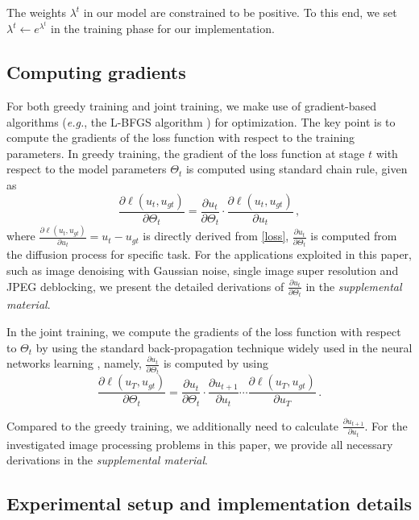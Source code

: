 \documentclass[10pt,journal,compsoc]{IEEEtran}
\newcommand{\eg}{\emph{e.g.}}
\begin{document}
{The weights $\lambda^t$ in our model are constrained to be positive. 
To this end, we set $\lambda^t \leftarrow e^{\lambda^t}$ in the training phase 
for our implementation.} 
\subsection{Computing gradients}
For both greedy training and joint training, we make use of gradient-based algorithms (\eg, 
the L-BFGS algorithm \cite{lbfgs}) for optimization. 
The key point is to compute the gradients of the loss function with respect to the training parameters. 
In greedy training, the gradient of 
the loss function at stage $t$ with respect to the model parameters $\Theta_t$ is computed using standard chain rule, given as
\begin{equation}\label{chainrule}
\frac {\partial \ell(u_t, u_{gt})}{\partial \Theta_t} = 
\frac {\partial u_t}{\partial \Theta_t} \cdot \frac {\partial \ell(u_t, u_{gt})}{\partial u_t} \,,
\end{equation}
where $\frac {\partial \ell(u_t, u_{gt})}{\partial u_t} = u_t - u_{gt}$ is directly derived from \eqref{loss}, 
$\frac {\partial u_t}{\partial \Theta_t}$ is computed from the diffusion process for specific task. For the applications exploited in this 
paper, such as 
image denoising with Gaussian noise, single image super resolution and JPEG deblocking, we present the detailed derivations 
of $\frac {\partial u_t}{\partial \Theta_t}$ in the \textit{supplemental material}.



In the joint training, we compute the gradients of the loss function with respect to $\Theta_t$ by using 
the standard back-propagation technique widely used in the neural networks learning \cite{lecun1998gradient}, namely, 
$\frac {\partial u_t}{\partial \Theta_t}$ is computed by using
\[
\frac {\partial \ell(u_T, u_{gt})}{\partial \Theta_t} = 
\frac {\partial u_t}{\partial \Theta_t} \cdot \frac {\partial u_{t+1}}{\partial u_{t}} \cdots
\frac {\partial \ell(u_T, u_{gt})}{\partial u_T} \,.
\]

Compared to the greedy training, we additionally need to calculate $\frac {\partial u_{t+1}}{\partial u_{t}}$. 
For the investigated image processing problems in this paper, we provide all necessary 
derivations in the \textit{supplemental material}. 

\subsection{Experimental setup and implementation details}
\end{document}
